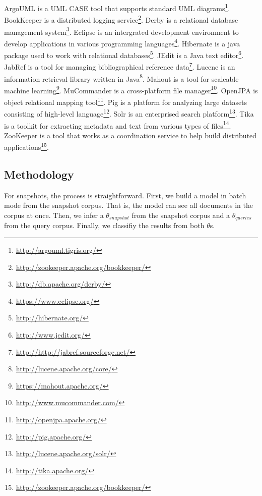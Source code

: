 ArgoUML is a UML CASE tool that supports standard UML diagrams\footnote{\url{http://argouml.tigris.org/}}.
BookKeeper is a distributed logging service\footnote{\url{http://zookeeper.apache.org/bookkeeper/}}.
Derby is a relational database management system\footnote{\url{http://db.apache.org/derby/}}.
Eclipse is an intergrated development environment to develop applications in various programming languages\footnote{\url{https://www.eclipse.org/}}.
Hibernate is a java package used to work with relational databases\footnote{\url{http://hibernate.org/}}.
JEdit is a Java text editor\footnote{\url{http://www.jedit.org/}}.
JabRef is a tool for managing bibliographical reference data\footnote{\url{http://http://jabref.sourceforge.net/}}.
Lucene is an information retrieval library written in Java\footnote{\url{http://lucene.apache.org/core/}}.
Mahout is a tool for scaleable machine learning\footnote{\url{https://mahout.apache.org/}}.
MuCommander is a cross-platform file manager\footnote{\url{http://www.mucommander.com/}}.
OpenJPA is object relational mapping tool\footnote{\url{http://openjpa.apache.org/}}.
Pig is a platform for analyzing large datasets consisting of high-level language\footnote{\url{http://pig.apache.org/}}.
Solr is an enterprised search platform\footnote{\url{http://lucene.apache.org/solr/}}.
Tika is a toolkit for extracting metadata and text from various types of files\footnote{\url{http://tika.apache.org/}}.
ZooKeeper is a tool that works as a coordination service to help build distributed applications\footnote{\url{http://zookeeper.apache.org/bookkeeper/}}.



\subsection{Methodology}
\label{sec:methodology}

For snapshots, the process is straightforward.
First, we build a model in batch mode from the snapshot corpus.
That is, the model can see all documents in the corpus at once.
Then, we infer a $\theta_{snapshot}$ from the snapshot corpus
and a $\theta_{queries}$ from the query corpus.
Finally, we classifiy the results from both $\theta$s.

\begin{comment}
\begin{enumerate}
    \item Build model from the snapshot corpus in batch mode
    \item Infer a $\theta_{snapshot}$ from the snapshot corpus
    \item Infer a $\theta_{queries}$ from the query corpus
    \item Classifiy, or rank, the results from both $\theta$s
\end{enumerate}
\end{comment}


